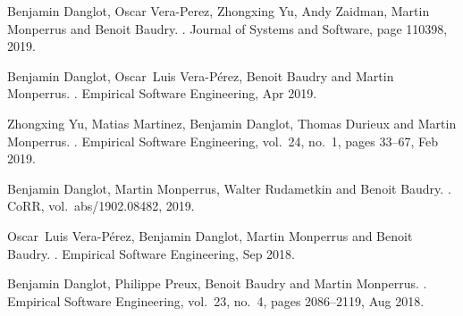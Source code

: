 \renewcommand\bibname{~}
\vspace{-2.8cm}
\let\oldaddcontentsline\addcontentsline%
\renewcommand{\addcontentsline}[3]{}%
\begingroup
\let\clearpage\relax
\begin{thebibliography}{xxxx}
	
	Benjamin Danglot, Oscar Vera-Perez, Zhongxing Yu, Andy Zaidman, Martin
	Monperrus and Benoit Baudry.
	.
	\newblock Journal of Systems and Software, page 110398, 2019.
	
	Benjamin Danglot, Oscar~Luis Vera-P{\'e}rez, Benoit Baudry and Martin
	Monperrus.
	.
	\newblock Empirical Software Engineering, Apr 2019.
	
	Zhongxing Yu, Matias Martinez, Benjamin Danglot, Thomas Durieux and Martin
	Monperrus.
	.
	\newblock Empirical Software Engineering, vol.~24, no.~1, pages 33--67, Feb
	2019.
	
	Benjamin Danglot, Martin Monperrus, Walter Rudametkin and Benoit Baudry.
	.
	\newblock CoRR, vol.~abs/1902.08482, 2019.
	
	Oscar~Luis Vera-P{\'e}rez, Benjamin Danglot, Martin Monperrus and Benoit
	Baudry.
	.
	\newblock Empirical Software Engineering, Sep 2018.
	
	Benjamin Danglot, Philippe Preux, Benoit Baudry and Martin Monperrus.
	.
	\newblock Empirical Software Engineering, vol.~23, no.~4, pages 2086--2119, Aug
	2018.
	
\end{thebibliography}
\endgroup
\let\addcontentsline\oldaddcontentsline%

